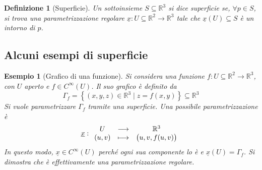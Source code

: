 \documentclass[12pt]{scrartcl}
\theoremstyle{style}
\newtheorem{esempio}{Esempio}[section]
\newtheorem{definizione}{Definizione}[section]
\numberwithin{equation}{subsection}
\begin{document}
\begin{definizione}
	[Superficie]
	Un sottoinsieme $S \subseteq \mathbb{R}^3$ si dice \textit{superficie} se, $\forall p \in S$, si trova una parametrizzazione regolare $\underline{x}:U\subseteq \mathbb{R}^2 \to \mathbb{R}^3$ tale che $\underline{x}(U) \subseteq S$ \`e un intorno di $p$.
\end{definizione}

\subsection{Alcuni esempi di superficie}
\begin{esempio}
	[Grafico di una funzione]
	Si considera una funzione $f:U \subseteq \mathbb{R}^2 \to \mathbb{R}^3$, con $U$ aperto e $f \in C^\infty(U)$.
	Il suo grafico \`e definito da
	\[
	\Gamma_f = \left\{ (x,y,z) \in \mathbb{R}^3  \mid z= f(x,y) \right\} \subseteq \mathbb{R}^3
	\] 
	Si vuole parametrizzare $\Gamma_f$ tramite una superficie.
	Una possibile parametrizzazione \`e 
	\[
		\underline{x}:
	\begin{array}
		{c c c}
		U & \longrightarrow & \mathbb{R}^3\\
		(u,v) &\longmapsto & \big(u,v,f(u,v)\big)
	\end{array}
	\] 
	In questo modo, $\underline{x} \in C^\infty(U)$ perch\'e ogni sua componente lo \`e e $\underline{x}(U) = \Gamma_f$.
	Si dimostra che \`e effettivamente una parametrizzazione regolare.
\end{esempio}
\end{document}
